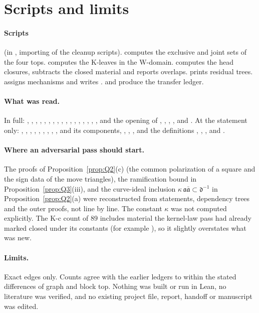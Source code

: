 \documentclass[11pt]{article}
\theoremstyle{remark}
\begin{document}
\section{Scripts and limits}\label{sec:limits}

\paragraph{Scripts} (in , importing  of the cleanup scripts).  computes the exclusive and joint sets of the four tops.  computes the K-leaves in the W-domain.  computes the head closures, subtracts the closed material and reports overlaps.  prints residual trees.  assigns mechanisms and writes .  and  produce the transfer ledger.

\paragraph{What was read.} In full: , , , , , , , , , , , , , , , , , and the opening of , , , ,  and . At the statement only: , , , , , , , , ,  and its components, , , , and the definitions , , ,  and .

\paragraph{Where an adversarial pass should start.} The proofs of Proposition~\ref{prop:Q2}(c) (the common polarization of a square and the sign data of the move triangles), the ramification bound in Proposition~\ref{prop:Q3}(iii), and the curve-ideal inclusion $\kappa\,\mathfrak a\bar{\mathfrak a}\subset\mathfrak d^{-1}$ in Proposition~\ref{prop:Q2}(a) were reconstructed from statements, dependency trees and the outer proofs, not line by line. The constant $\kappa$ was not computed explicitly. The K-c count of $89$ includes material the kernel-law pass had already marked closed under its constants (for example ), so it slightly overstates what was new.

\paragraph{Limits.} Exact edges only. Counts agree with the earlier ledgers to within the stated differences of graph and block top. Nothing was built or run in Lean, no literature was verified, and no existing project file, report, handoff or manuscript was edited.
\end{document}
